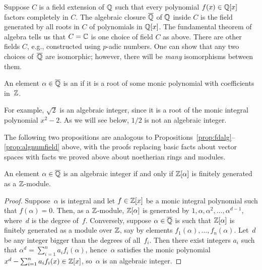Suppose $C$ is a field extension of $\mathbb{Q}$ such that every polynomial
$f(x)\in \mathbb{Q}[x]$ factors completely in $C$.  
The algebraic closure $\overline{\mathbb{Q}}$ of $\mathbb{Q}$ inside $C$
is the  field generated by all roots in $C$ of polynomials
in $\mathbb{Q}[x]$.
The fundamental theorem of algebra tells us that
$C=\mathbb{C}$ is one choice of field $C$ as above.
There are other fields $C$, e.g., constructed using $p$-adic numbers.
One can show that any two choices of~$\overline{\mathbb{Q}}$ are isomorphic; however,
there will be {\em many} isomorphisms between them.   

\begin{definition}
An element $\alpha\in\overline{\mathbb{Q}}$ is an  if it is a
root of some monic polynomial with coefficients in~$\mathbb{Z}$.
\end{definition}
For example, $\sqrt{2}$ is an algebraic integer, since it is a root
of the monic integral polynomial $x^2-2$. As we will see below,
$1/2$ is not an algebraic integer.

The following two propositions are analogous to
Propositions~\ref{prop:fdalg}--\ref{prop:algnumfield} above, with
the proofs replacing basic facts about vector spaces with facts we
proved above about noetherian rings and modules.

\begin{proposition}\label{prop:intfg}
An element $\alpha\in\overline{\mathbb{Q}}$ is an algebraic integer if and only if $\mathbb{Z}[\alpha]$ is
finitely generated as a $\mathbb{Z}$-module.  
\end{proposition}
\begin{proof}
Suppose~$\alpha$ is integral and let $f\in\mathbb{Z}[x]$ be a monic integral polynomial
such that $f(\alpha)=0$.  Then, as a $\mathbb{Z}$-module, $\mathbb{Z}[\alpha]$
is generated by $1,\alpha,\alpha^2,\ldots,\alpha^{d-1}$, where~$d$ is
the degree of~$f$.   Conversely, suppose $\alpha\in\overline{\mathbb{Q}}$ is such that
$\mathbb{Z}[\alpha]$ is finitely generated as a module over $\mathbb{Z}$, say by elements 
$f_1(\alpha), \ldots, f_n(\alpha)$.  Let~$d$ be any integer bigger
than the degrees of all~$f_i$.  Then there exist integers $a_i$ such
that $\alpha^d = \sum_{i=1}^n a_i f_i(\alpha)$, hence~$\alpha$ satisfies
the monic polynomial $x^d - \sum_{i=1}^n a_i f_i(x) \in \mathbb{Z}[x]$, so~$\alpha$
is an algebraic integer.
\end{proof}


